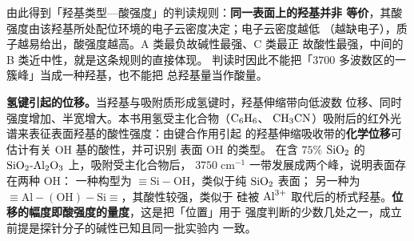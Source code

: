 \begin{infer}
由此得到「羟基类型—酸强度」的判读规则：\textbf{同一表面上的羟基并非
等价}，其酸强度由该羟基所处配位环境的电子云密度决定；电子云密度越低
（越缺电子），质子越易给出，酸强度越高。A 类最负故碱性最强、C 类最正
故酸性最强，中间的 B 类近中性，就是这条规则的直接体现。
判读时因此不能把「$3700$ 多波数区的一簇峰」当成一种羟基，也不能把
总羟基量当作酸量。

\textbf{氢键引起的位移。}当羟基与吸附质形成氢键时，羟基伸缩带向低波数
位移、同时强度增加、半宽增大。本书用氢受主化合物（$\ce{C6H6}$、
$\ce{CH3CN}$）吸附后的红外光谱来表征表面羟基的酸性强度：由键合作用引起
的羟基伸缩吸收带的\textbf{化学位移}可估计有关 OH 基的酸性，并可识别
表面 OH 的类型。
在含 $75\%$ $\ce{SiO2}$ 的 $\ce{SiO2{-}Al2O3}$ 上，吸附受主化合物后，
$3750\;\mathrm{cm^{-1}}$ 一带发展成两个峰，说明表面存在两种 OH：
一种构型为 $\equiv\!\mathrm{Si{-}OH}$，类似于纯 $\ce{SiO2}$ 表面；
另一种为 $\equiv\!\mathrm{Al{-}(OH){-}Si}\equiv$，其酸性较强，类似于
硅被 $\ce{Al^{3+}}$ 取代后的桥式羟基。\textbf{位移的幅度即酸强度的量度}，这是把「位置」用于
强度判断的少数几处之一，成立前提是探针分子的碱性已知且同一批实验内
一致。
\end{infer}

